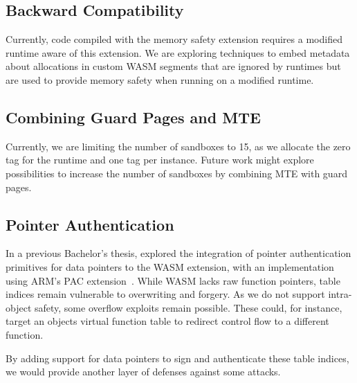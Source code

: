 \subsection{Backward Compatibility}
\label{subsec:backward-compatibility}

Currently, code compiled with the memory safety extension requires a modified runtime aware of this extension.
We are exploring techniques to embed metadata about allocations in custom \ac{WASM} segments that are ignored by runtimes but are used to provide memory safety when running on a modified runtime.

\subsection{Combining Guard Pages and \ac{MTE}}
\label{subsec:combining-guard-pages-and-mte}

Currently, we are limiting the number of sandboxes to 15, as we allocate the zero tag for the runtime and one tag per instance.
Future work might explore possibilities to increase the number of sandboxes by combining \ac{MTE} with guard pages.

\subsection{Pointer Authentication}
\label{subsec:future-work-pac}

In a previous Bachelor's thesis, \citeauthor{rehde2023wasm} explored the integration of pointer authentication primitives for data pointers to the \ac{WASM} extension, with an implementation using ARM's \ac{PAC} extension~\cite{rehde2023wasm}.
While \ac{WASM} lacks raw function pointers, table indices remain vulnerable to overwriting and forgery.
As we do not support intra-object safety, some overflow exploits remain possible.
These could, for instance, target an objects virtual function table to redirect control flow to a different function.

By adding support for data pointers to sign and authenticate these table indices, we would provide another layer of defenses against some attacks.
